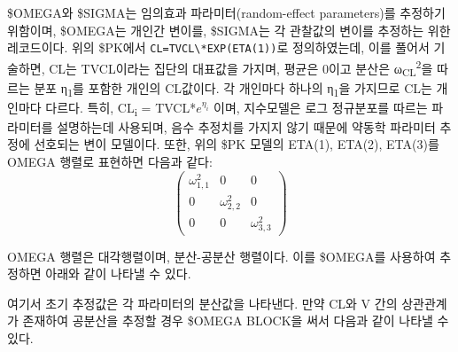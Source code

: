 \documentclass[
  11pt,
  krantz2,
  a4paper]{krantz}
\newenvironment{Shaded}{\begin{snugshade}}{\end{snugshade}}
\newcommand{\FloatTok}[1]{\textcolor[rgb]{0.00,0.00,0.81}{#1}}
\newcommand{\NormalTok}[1]{#1}
\newcommand{\OperatorTok}[1]{\textcolor[rgb]{0.81,0.36,0.00}{\textbf{#1}}}
\theoremstyle{definition}
\theoremstyle{definition}
\theoremstyle{definition}
\theoremstyle{remark}
\begin{document}
\$OMEGA와 \$SIGMA는 임의효과 파라미터(random-effect parameters)를 추정하기 위함이며, \$OMEGA는 개인간 변이를, \$SIGMA는 각 관찰값의 변이를 추정하는 위한 레코드이다. 위의 \$PK에서 \texttt{CL=TVCL\textbackslash{}*EXP(ETA(1))}로 정의하였는데, 이를 풀어서 기술하면, CL는 TVCL이라는 집단의 대표값을 가지며, 평균은 0이고 분산은 ω\textsubscript{CL}\textsuperscript{2}을 따르는 분포 η\textsubscript{1}를 포함한 개인의 CL값이다. 각 개인마다 하나의 η\textsubscript{1}을 가지므로 CL는 개인마다 다르다. 특히, CL\textsubscript{i} = TVCL*\(e^{\eta_{i}}\) 이며, 지수모델은 로그 정규분포를 따르는 파라미터를 설명하는데 사용되며, 음수 추정치를 가지지 않기 때문에 약동학 파라미터 추정에 선호되는 변이 모델이다. 또한, 위의 \$PK 모델의 ETA(1), ETA(2), ETA(3)를 OMEGA 행렬로 표현하면 다음과 같다:
\begin{equation}
\begin{pmatrix} 
   \omega_{1,1}^2 & 0 & 0 \\
   0 & \omega_{2,2}^2 & 0 \\
   0 & 0 & \omega_{3,3}^2
\label{eq:iivomega}
\end{pmatrix}
\end{equation}

OMEGA 행렬은 대각행렬이며, 분산-공분산 행렬이다. 이를 \$OMEGA를 사용하여 추정하면 아래와 같이 나타낼 수 있다.

\begin{Shaded}
\end{Shaded}

여기서 초기 추정값은 각 파라미터의 분산값을 나타낸다. 만약 CL와 V 간의 상관관계가 존재하여 공분산을 추정할 경우 \$OMEGA BLOCK을 써서 다음과 같이 나타낼 수 있다.
\end{document}
